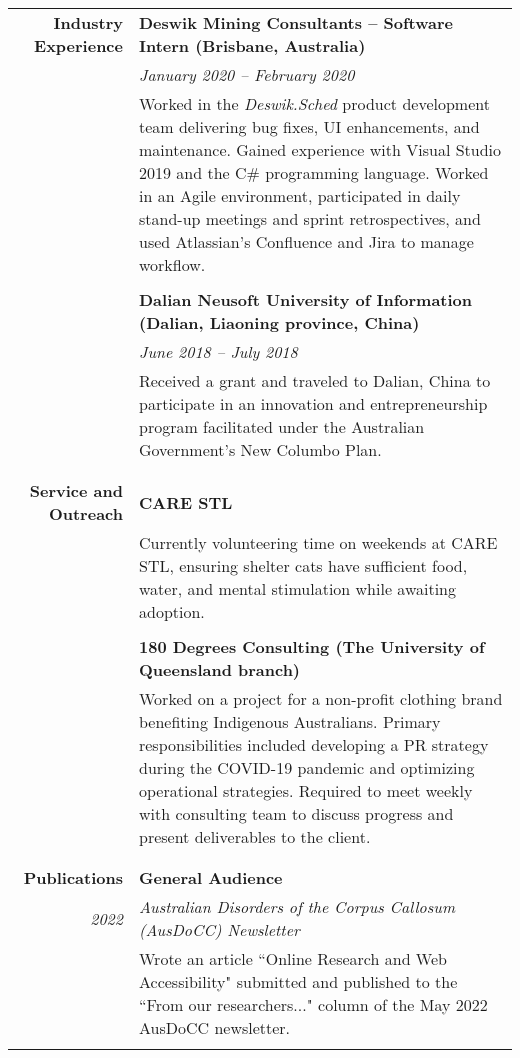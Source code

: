 \documentclass{article}
\begin{document}
\begin{longtable}{>{\columncolor{LeftColumn}}r | p{13cm}}
		\large\textbf{Industry Experience} 	& \large\textbf{Deswik Mining Consultants – Software Intern (Brisbane, Australia)} \\
											& \textit{January 2020 – February 2020} \\
											& Worked in the \textit{Deswik.Sched} product development team delivering bug fixes, UI enhancements, and maintenance. Gained experience with Visual Studio 2019 and the C\# programming language. Worked in an Agile environment, participated in daily stand-up meetings and sprint retrospectives, and used Atlassian’s Confluence and Jira to manage workflow. \\ 
											& \\

											& \large\textbf{Dalian Neusoft University of Information (Dalian, Liaoning province, China)} \\
											& \textit{June 2018 – July 2018} \\
											& Received a grant and traveled to Dalian, China to participate in an innovation and entrepreneurship program facilitated under the Australian Government’s New Columbo Plan. \\
											& \\
											\hline \\

		\large\textbf{Service and Outreach} & \large\textbf{CARE STL} \\
											& Currently volunteering time on weekends at CARE STL, ensuring shelter cats have sufficient food, water, and mental stimulation while awaiting adoption. \\	
											& \\

											& \large\textbf{180 Degrees Consulting (The University of Queensland branch)} \\
											& Worked on a project for a non-profit clothing brand benefiting Indigenous Australians. Primary responsibilities included developing a PR strategy during the COVID-19 pandemic and optimizing operational strategies. Required to meet weekly with consulting team to discuss progress and present deliverables to the client. \\	
											& \\
											\hline
											
											\pagebreak

											\hline \\
		\large\textbf{Publications}			& \large\textbf{General Audience} \\
		\large\textit{2022}					& \large\textit{Australian Disorders of the Corpus Callosum (AusDoCC) Newsletter} \\
											& Wrote an article ``Online Research and Web Accessibility" submitted and published to the ``From our researchers..." column of the May 2022 AusDoCC newsletter. \\	
											& \\
											

\end{longtable}
\end{document}
